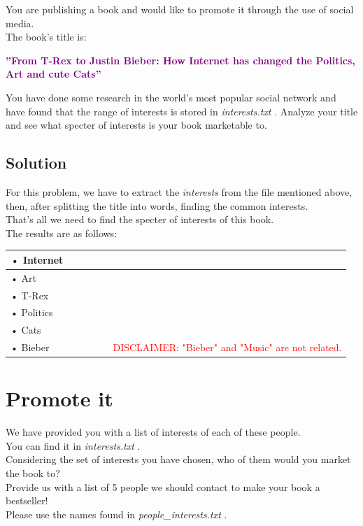 \documentclass{article}
\begin{document}
    You are publishing a book and would like to promote it through the use
    of social media.\\
    The book’s title is:

    \vspace{2em}
    \textcolor{purple}{\centerline{\textbf{”From T-Rex to Justin Bieber:
    How Internet has changed the Politics, Art and cute Cats”}}}

    \vspace{2em}
    You have done some research in the world’s most popular social network
    and have found that the range of interests is stored in \emph{interests.txt} .
    Analyze your title and see what specter of interests is your book marketable to.

    \vspace{3em}

    \subsection{Solution}
      For this problem, we have to extract the \textit{interests} from the file
      mentioned above, then, after splitting the title into words, finding
      the common interests.\\
      That's all we need to find the specter of interests of this book.\\
      The results are as follows:

      \vspace{2em}

      \begin{table}[H]
        \centering
        \begin{tabular}{l}
            • Internet \\ \hline
            • Art \\ \hline
            • T-Rex \\ \hline
            • Politics \\ \hline
            • Cats \\ \hline
            • Bieber~~~~~~~~~~~~~\textcolor{red}{DISCLAIMER: "Bieber" and "Music" are not related.} \\
        \end{tabular}
      \end{table}

    \newpage


  \section{Promote it}
  We have provided you with a list of interests of each of these people.\\
  You can find it in \emph{interests.txt} .\\
  Considering the set of interests you have chosen, who of them would you market
  the book to?\\
  Provide us with a list of 5 people we should contact to make your book a bestseller!\\
  Please use the names found in \emph{people\_interests.txt} .\\
\end{document}
